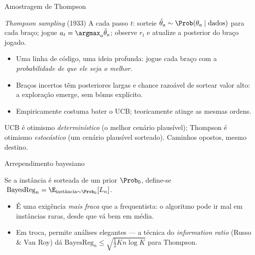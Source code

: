 \documentclass[aspectratio=169, 11pt]{beamer}
\begin{document}
\begin{frame}{Amostragem de Thompson}
  \begin{algbox}{\emph{Thompson sampling} (1933)}
    {\small A cada passo $t$: sorteie $\tilde\theta_a \sim
    \Prob(\theta_a\mid \text{dados})$ para cada braço; jogue
    $a_t = \argmax_a \tilde\theta_a$; observe $r_t$ e atualize a posterior do
    braço jogado.}
  \end{algbox}

  {\small
  \begin{itemize}\setlength{\itemsep}{0.2ex}
    \item Uma linha de código, uma ideia profunda: jogue cada braço com a
          \emph{probabilidade de que ele seja o melhor}.
    \item Braços incertos têm posteriores largas e chance razoável de sortear
          valor alto: a exploração \alert{emerge}, sem bônus explícito.
    \item Empiricamente costuma bater o UCB; teoricamente atinge as mesmas
          ordens.
  \end{itemize}}

  \begin{ideiabox}
    UCB é otimismo \emph{determinístico} (o melhor cenário plausível);
    Thompson é otimismo \emph{estocástico} (um cenário plausível sorteado).
    Caminhos opostos, mesmo destino.
  \end{ideiabox}
\end{frame}

\begin{frame}{Arrependimento bayesiano}
  \begin{defbox}{}
    Se a instância é sorteada de um prior $\Prob_0$, define-se
    $\;\mathrm{BayesReg}_n = \E_{\text{instância}\sim\Prob_0}[L_n]$.
  \end{defbox}

  {\small
  \begin{itemize}\setlength{\itemsep}{0.2ex}
    \item É uma exigência \emph{mais fraca} que a frequentista: o algoritmo
          pode ir mal em instâncias raras, desde que vá bem em média.
    \item Em troca, permite análises elegantes --- a técnica do
          \emph{information ratio} (Russo \& Van Roy) dá
          $\mathrm{BayesReg}_n \le \sqrt{\tfrac12 Kn\log K}$ para Thompson.
  \end{itemize}}

\end{frame}
\end{document}
